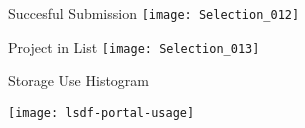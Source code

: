 \begin{frame}[c]{Succesful Submission}
    \texttt{[image: Selection\_012]}
\end{frame}

\begin{frame}[c]{Project in List}
    \texttt{[image: Selection\_013]}
\end{frame}

\begin{frame}[c]{Storage Use Histogram}
    \begin{center}
    \texttt{[image: lsdf-portal-usage]}
    \end{center}
\end{frame}
